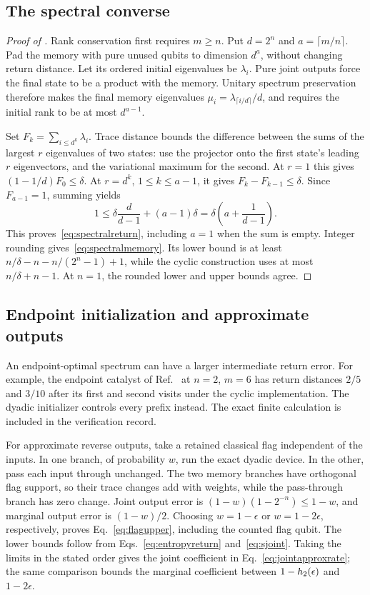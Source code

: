 \subsection{The spectral converse}
\begin{proof}[Proof of ]
Rank conservation first requires $m\ge n$. Put $d=2^n$ and $a=\lceil m/n\rceil$. Pad the memory with pure unused qubits to dimension $d^a$, without changing return distance. Let its ordered initial eigenvalues be $\lambda_i$. Pure joint outputs force the final state to be a product with the memory. Unitary spectrum preservation therefore makes the final memory eigenvalues $\mu_i=\lambda_{\lceil i/d\rceil}/d$, and requires the initial rank to be at most $d^{a-1}$.

Set $F_k=\sum_{i\le d^k}\lambda_i$. Trace distance bounds the difference between the sums of the largest $r$ eigenvalues of two states: use the projector onto the first state's leading $r$ eigenvectors, and the variational maximum for the second. At $r=1$ this gives $(1-1/d)F_0\le\delta$. At $r=d^k$, $1\le k\le a-1$, it gives $F_k-F_{k-1}\le\delta$. Since $F_{a-1}=1$, summing yields
\begin{equation}
 1\le\delta\frac d{d-1}+(a-1)\delta
   =\delta\left(a+\frac1{d-1}\right).
\end{equation}
This proves~\eqref{eq:spectralreturn}, including $a=1$ when the sum is empty. Integer rounding gives~\eqref{eq:spectralmemory}. Its lower bound is at least $n/\delta-n-n/(2^n-1)+1$, while the cyclic construction uses at most $n/\delta+n-1$. At $n=1$, the rounded lower and upper bounds agree.
\end{proof}

\subsection{Endpoint initialization and approximate outputs}
An endpoint-optimal spectrum can have a larger intermediate return error. For example, the endpoint catalyst of Ref.~\cite{ng} at $n=2$, $m=6$ has return distances $2/5$ and $3/10$ after its first and second visits under the cyclic implementation. The dyadic initializer controls every prefix instead. The exact finite calculation is included in the verification record.

For approximate reverse outputs, take a retained classical flag independent of the inputs. In one branch, of probability $w$, run the exact dyadic device. In the other, pass each input through unchanged. The two memory branches have orthogonal flag support, so their trace changes add with weights, while the pass-through branch has zero change. Joint output error is $(1-w)(1-2^{-n})\le1-w$, and marginal output error is $(1-w)/2$. Choosing $w=1-\epsilon$ or $w=1-2\epsilon$, respectively, proves Eq.~\eqref{eq:flagupper}, including the counted flag qubit. The lower bounds follow from Eqs.~\eqref{eq:entropyreturn} and~\eqref{eq:sjoint}. Taking the limits in the stated order gives the joint coefficient in Eq.~\eqref{eq:jointapproxrate}; the same comparison bounds the marginal coefficient between $1-h_2(\epsilon)$ and $1-2\epsilon$.
